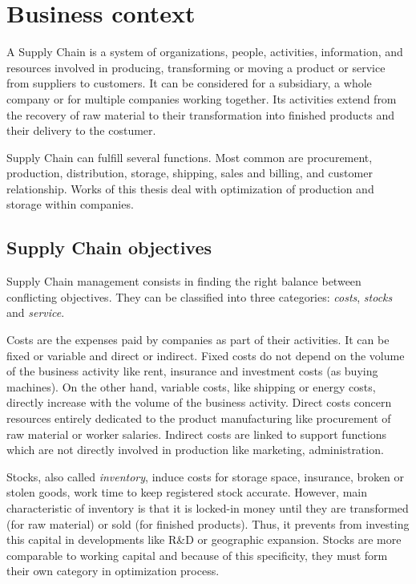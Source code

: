 \chapter{Business context}
\label{chap:business-context}


A Supply Chain is a system of organizations, people, activities, information, and resources involved in producing, transforming or moving a product or service from suppliers to customers.
It can be considered for a subsidiary, a whole company or for multiple companies working together.
Its activities extend from the recovery of raw material to their transformation into finished products and their delivery to the costumer.


Supply Chain can fulfill several functions.
Most common are procurement, production, distribution, storage, shipping, sales and billing, and customer relationship.
Works of this thesis deal with optimization of production and storage within companies.


\section{Supply Chain objectives}
\label{sec:business-context:supply-chain-objectives}


Supply Chain management consists in finding the right balance between conflicting objectives.
They can be classified into three categories: \emph{costs}, \emph{stocks} and \emph{service}.


Costs are the expenses paid by companies as part of their activities.
It can be fixed or variable and direct or indirect.
Fixed costs do not depend on the volume of the business activity like rent, insurance and investment costs (as buying machines).
On the other hand, variable costs, like shipping or energy costs, directly increase with the volume of the business activity.
Direct costs concern resources entirely dedicated to the product manufacturing like procurement of raw material or worker salaries.
Indirect costs are linked to support functions which are not directly involved in production like marketing, administration.


Stocks, also called \emph{inventory}, induce costs for storage space, insurance, broken or stolen goods, work time to keep registered stock accurate.
However, main characteristic of inventory is that it is locked-in money until they are transformed (for raw material) or sold (for finished products).
Thus, it prevents from investing this capital in developments like R\&D or geographic expansion.
Stocks are more comparable to working capital and because of this specificity, they must form their own category in optimization process.


